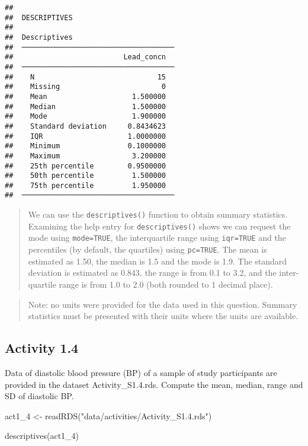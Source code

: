 \documentclass[
]{memoir}
\newenvironment{Shaded}{\begin{snugshade}}{\end{snugshade}}
\newcommand{\FunctionTok}[1]{\textcolor[rgb]{0.00,0.00,0.00}{#1}}
\newcommand{\NormalTok}[1]{#1}
\newcommand{\OtherTok}[1]{\textcolor[rgb]{0.56,0.35,0.01}{#1}}
\newcommand{\StringTok}[1]{\textcolor[rgb]{0.31,0.60,0.02}{#1}}
\begin{document}
\begin{verbatim}
## 
##  DESCRIPTIVES
## 
##  Descriptives                         
##  ──────────────────────────────────── 
##                          Lead_concn   
##  ──────────────────────────────────── 
##    N                             15   
##    Missing                        0   
##    Mean                    1.500000   
##    Median                  1.500000   
##    Mode                    1.900000   
##    Standard deviation     0.8434623   
##    IQR                    1.0000000   
##    Minimum                0.1000000   
##    Maximum                 3.200000   
##    25th percentile        0.9500000   
##    50th percentile         1.500000   
##    75th percentile         1.950000   
##  ────────────────────────────────────
\end{verbatim}

\begin{quote}
We can use the \texttt{descriptives()} function to obtain summary statistics. Examining the help entry for \texttt{descriptives()} shows we can request the mode using \texttt{mode=TRUE}, the interquartile range using \texttt{iqr=TRUE} and the percentiles (by default, the quartiles) using \texttt{pc=TRUE}.
The mean is estimated as 1.50, the median is 1.5 and the mode is 1.9. The standard deviation is estimated as 0.843, the range is from 0.1 to 3.2, and the inter-quartile range is from 1.0 to 2.0 (both rounded to 1 decimal place).
\end{quote}

\begin{quote}
Note: no units were provided for the data used in this question. Summary statistics must be presented with their units where the units are available.
\end{quote}

\hypertarget{activity-1.4}{%
\subsection*{Activity 1.4}\label{activity-1.4}}

Data of diastolic blood pressure (BP) of a sample of study participants are provided in the dataset Activity\_S1.4.rds. Compute the mean, median, range and SD of diastolic BP.

\begin{Shaded}
\begin{Highlighting}[]
\NormalTok{act1\_4 }\OtherTok{\textless{}{-}} \FunctionTok{readRDS}\NormalTok{(}\StringTok{"data/activities/Activity\_S1.4.rds"}\NormalTok{)}

\FunctionTok{descriptives}\NormalTok{(act1\_4)}
\end{Highlighting}
\end{Shaded}
\end{document}
